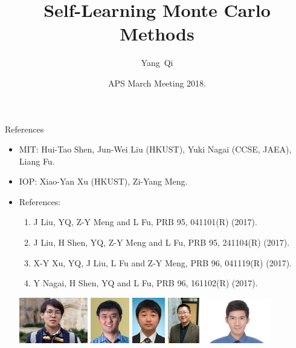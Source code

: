 \documentclass[xcolor=table, 10pt, aspectratio=169]{beamer}
\title[SMLC] %
{Self-Learning Monte Carlo Methods}
\author[Y Qi] %
{Yang~Qi}
\institute[Fudan] %
{Department of Physics, Fudan University}
\date{APS March Meeting 2018.}
\begin{document}
\begin{frame}
  \titlepage
\end{frame}

\begin{frame}{References}
\begin{itemize}
\item MIT: Hui-Tao Shen, Jun-Wei Liu (HKUST), Yuki Nagai (CCSE, JAEA), Liang Fu.
\item IOP: Xiao-Yan Xu (HKUST), Zi-Yang Meng.
\item References:
\begin{enumerate}
  \item J Liu, YQ, Z-Y Meng and L Fu, PRB 95, 041101(R) (2017).
  \item J Liu, H Shen, YQ, Z-Y Meng and L Fu, PRB 95, 241104(R) (2017).
  \item X-Y Xu, YQ, J Liu, L Fu and Z-Y Meng, PRB 96, 041119(R) (2017).
  \item Y Nagai, H Shen, YQ and L Fu, PRB 96, 161102(R) (2017).
\end{enumerate}
\begin{center}
	\includegraphics[height=2cm]{../people/huitaoshen}
	\includegraphics[height=2cm]{../people/junweiliu}
	\includegraphics[height=2cm]{../people/yuki}
	\includegraphics[height=2cm]{../people/liangfu}
	\includegraphics[height=2cm]{../people/xiaoyanxu}

\end{center}
\end{itemize}
\end{frame}
\end{document}
